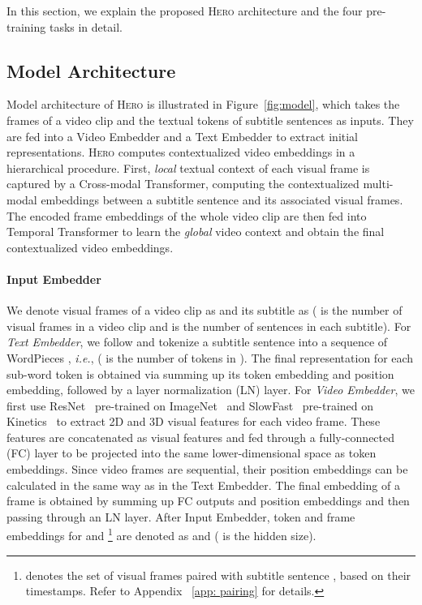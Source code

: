 \documentclass[11pt,a4paper]{article}
\begin{document}
In this section, we explain the proposed \textsc{Hero} architecture and the four pre-training tasks in detail.

\subsection{Model Architecture}\label{sec:method_overview}

Model architecture of \textsc{Hero} is illustrated in Figure~\ref{fig:model}, which takes the frames of a video clip and the textual tokens of subtitle sentences as inputs.
They are fed into a Video Embedder and a Text Embedder to extract initial representations. \textsc{Hero} computes contextualized video embeddings in a hierarchical procedure. 
First, \emph{local} textual context of each visual frame is captured by a Cross-modal Transformer, computing the contextualized multi-modal embeddings between a subtitle sentence and its associated visual frames. 
The encoded frame embeddings of the whole video clip are then fed into Temporal Transformer to learn the \emph{global} video context and obtain the final contextualized video embeddings.

\paragraph{Input Embedder}
We denote visual frames of a video clip as  and its subtitle as  ( is the number of visual frames in a video clip and  is the number of sentences in each subtitle). For \textit{Text Embedder}, we follow \citet{liu2019roberta} and tokenize a subtitle sentence  into a sequence of WordPieces \citep{wu2016google}, \emph{i.e.},  ( is the number of tokens in ). The final representation for each sub-word token is obtained via summing up its token embedding and position embedding, followed by a layer normalization (LN) layer. For \textit{Video Embedder}, we first use ResNet~\citep{he2016deep} pre-trained on ImageNet~\citep{deng2009imagenet} and SlowFast~\citep{feichtenhofer2019slowfast} pre-trained on Kinetics~\citep{kay2017kinetics} to extract 2D and 3D visual features for each video frame. These features are concatenated as visual features and fed through a fully-connected (FC) layer to be projected into the same lower-dimensional space as token embeddings. Since video frames are sequential, their position embeddings can be calculated in the same way as in the Text Embedder. The final embedding of a frame is obtained by summing up FC outputs and position embeddings and then passing through an LN layer. After Input Embedder, token and frame embeddings for  and \footnote{ denotes the set of visual frames paired with subtitle sentence , based on their timestamps. Refer to Appendix
~\ref{app: pairing} 
for details. 

} are denoted as  and  ( is the hidden size).
\end{document}
